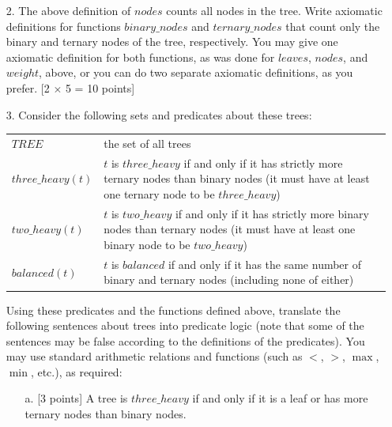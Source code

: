 \documentclass[12pt,fleqn]{article}
\begin{document}
\begin{enumerate}
\item[2.] The above definition of $nodes$ counts all nodes in the tree. Write axiomatic definitions for functions $binary\_nodes$ and $ternary\_nodes$ that count only the binary and ternary nodes of the tree, respectively. You may give one axiomatic definition for both functions, as was done for $leaves$, $nodes$, and $weight$, above, or you can do two separate axiomatic definitions, as you prefer. [2 $\times$ 5 = 10 points]




\clearpage

\item[3.] Consider the following sets and predicates about these trees:

\begin{center}
\begin{tabular}{lp{4in}}
$TREE$ & the set of all trees\\
$three\_heavy(t)$ & $t$ is $three\_heavy$ if and only if it has strictly more ternary nodes than binary nodes (it must have at least one ternary node to be $three\_heavy$)\\
$two\_heavy(t)$ & $t$ is $two\_heavy$ if and only if it has strictly more binary nodes than ternary nodes (it must have at least one binary node to be $two\_heavy$)\\
$balanced(t)$ & $t$ is $balanced$ if and only if it has the same number of binary and ternary nodes (including none of either)
\end{tabular}
\end{center}

Using these predicates and the functions defined above, translate the following sentences about trees into predicate logic (note that some of the sentences may be false according to the definitions of the predicates). You may use standard arithmetic relations and functions (such as $<$, $>$, $\max$, $\min$, etc.), as required:

\begin{enumerate}
\item[a.] [3 points] A tree is $three\_heavy$ if and only if it is a leaf or has more ternary nodes than binary nodes. 

\vspace{1in} %


\end{enumerate}
\end{enumerate}
\end{document}
